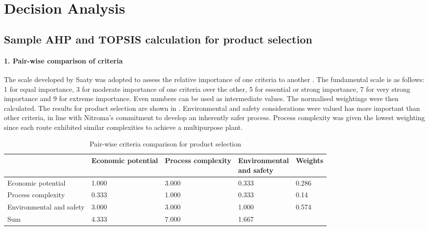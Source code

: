 \section{Decision Analysis}
\label{app:matrix}

\subsection{Sample AHP and TOPSIS calculation for product selection}

\paragraph{1. Pair-wise comparison of criteria}
The scale developed by Saaty was adopted to assess the relative importance of one criteria to another \cite{saaty_analytic_1987}. The fundamental scale is as follows: 1 for equal importance, 3 for moderate importance of one criteria over the other, 5 for essential or strong importance, 7 for very strong importance and 9 for extreme importance. Even numbers can be used as intermediate values. The normalised weightings were then calculated. The results for product selection are shown in . Environmental and safety considerations were valued has more important than other criteria, in line with Nitroma's commitment to develop an inherently safer process. Process complexity was given the lowest weighting since each route exhibited similar complexities to achieve a multipurpose plant.  

\begin{table}[H]
\centering
\caption{Pair-wise criteria comparison for product selection}
\label{tab:pairwise}
\begin{tabularx}{\linewidth}{l|XXX|l}
\toprule
                                                                & Economic potential & Process complexity & \splitcell{Environmental\\ and safety} & Weights \\ \midrule
Economic potential                        & 1.000              & 3.000              & 0.333                    & 0.286   \\
Process complexity                      & 0.333              & 1.000              & 0.333                    & 0.14    \\
Environmental and   safety & 3.000              & 3.000              & 1.000                    & 0.574   \\ \midrule
Sum                                      & 4.333              & 7.000              & 1.667                    &                              \\ \bottomrule
\end{tabularx}
\end{table}


